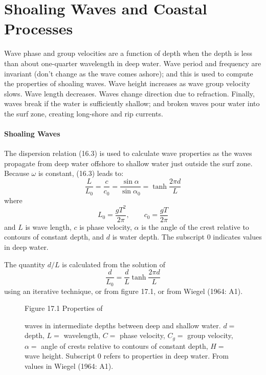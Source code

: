 \section{Shoaling Waves and Coastal Processes}
Wave phase and group velocities are a function of depth when the depth is less than about one-quarter wavelength in deep water. Wave period and frequency are invariant (don't change as the wave comes ashore); and this is used to compute the properties of shoaling waves. Wave height increases as wave group velocity slows. Wave length decreases. Waves change direction due to refraction. Finally, waves break if the water is sufficiently shallow; and broken waves pour water into the surf zone, creating long-shore and rip currents.

\paragraph{Shoaling Waves}
The dispersion relation (16.3) is used to calculate wave properties as the waves propagate from deep water offshore to shallow water just outside the surf zone. Because $\omega$ is constant, (16.3) leads to:
\begin{equation}
\frac{L}{L_{0}} = \frac{c}{c_{0}}=\frac{\sin \alpha }{\sin \alpha _{0}} = \tanh
\frac{2 \pi d}{L} \label{eq:intermed}
\end{equation}
where
\begin{equation}
L_{0} = \frac{g T^{2}}{2 \pi }, \qquad c_{0} = \frac{g T}{2 \pi } \label{eq:Lzero}
\end{equation}
and $L$ is wave length, $c$ is phase velocity, $\alpha $ is the angle of the crest relative to contours of constant depth, and $d$ is water depth. The subscript $0$ indicates values in deep water.

The quantity $d/L$ is calculated from the solution of
\begin{equation}
\frac{d}{L_{0}} = \frac{d}{L} \tanh \frac{2 \pi d}{L} \label{eq:intermediate}
\end{equation}
using an iterative technique, or from figure 17.1, or from Wiegel (1964: A1).

\begin{figure}[t!]
{}
\footnotesize
Figure 17.1 Properties of \rule{0mm}{3ex}waves in intermediate depths between deep and shallow water. $d=$ depth, $L=$ wavelength, $C=$ phase velocity, $C_g=$ group velocity, $\alpha = $ angle of crests relative to contours of constant depth, $H = $ wave height. Subscript $0$ refers to properties in deep water. From values in Wiegel (1964: A1).

\label{wiegelgraph}
\vspace{-4ex}
\end{figure}

